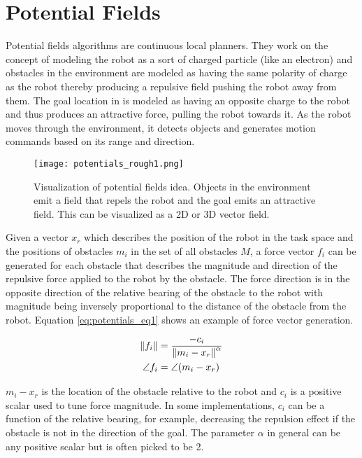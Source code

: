 \section{Potential Fields} \label{sec:navpotfields}
Potential fields algorithms are continuous local planners. They work on the concept of modeling the robot as a sort of
charged particle (like an electron) and obstacles in the environment are modeled as having the same polarity of charge as the robot thereby producing a repulsive field pushing the robot away
from them. The goal location in is modeled as having an opposite charge to the robot and thus produces an attractive force, pulling the robot towards it. As the robot moves through
the environment, it detects objects and generates motion commands based on its range and direction. 
\begin{figure}
	\centering
	\texttt{[image: potentials\_rough1.png]}
	\caption
	{Visualization of potential fields idea. Objects in the environment emit a field that repels the robot
	 and the goal emits an attractive field. This can be visualized as a 2D or 3D vector field.}
	\label{fig:potentials1}
\end{figure}

Given a vector $x_r$ which describes the position of the robot in the task space and the positions of obstacles
$m_i$ in the set of all obstacles $M$, a force vector $f_i$ can be generated for each obstacle that describes the 
magnitude and direction of the repulsive force applied to the robot by the obstacle. The force direction
is in the opposite direction of the relative bearing of the obstacle to the robot with magnitude being inversely
proportional to the distance of the obstacle from the robot. Equation \ref{eq:potentials_eq1} shows an example
of force vector generation.

\begin{align}
	\left\lVert f_i\right\rVert  &= \frac{-c_i}{\left\lVert m_i - x_r\right\rVert^\alpha}\\
	\angle{f_i} &= \angle(m_i - x_r)
\label{eq:potentials_eq1}
\end{align}

$m_i - x_r$ is the location of the obstacle relative to the robot and $c_i$ is a positive scalar used to tune force
magnitude. In some implementations, $c_i$ can be a function of the relative bearing, for example, decreasing the repulsion
effect if the obstacle is not in the direction of the goal. The parameter $\alpha$ in general can be any positive scalar
but is often picked to be 2.

